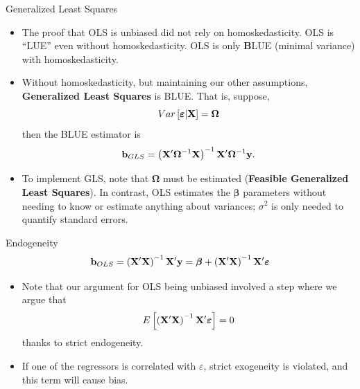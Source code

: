 \begin{frame}{Generalized Least Squares}
\begin{itemize}
	\item The proof that OLS is unbiased did not rely on homoskedasticity. OLS
	is ``LUE'' even without homoskedasticity. OLS is only {\bf B}LUE (minimal variance) with homoskedasticity.

	\smallskip
	\item Without homoskedasticity, but maintaining our other assumptions, {\bf Generalized
		Least Squares} is BLUE. That is, suppose,\[
	Var\left[\boldsymbol{\varepsilon} | {\bf X} \right] = \boldsymbol{\Omega}
	\]
	then the BLUE estimator is \[
	{\bf b}_{GLS} = \left({\bf X}'\boldsymbol{\Omega}^{-1}{\bf X}\right)^{-1} {\bf X}' \boldsymbol{\Omega}^{-1}{\bf y} .
	\]
	
	\smallskip
	\item To implement GLS, note that $\boldsymbol{\Omega}$ must be estimated ({\bf Feasible Generalized
		Least Squares}). In contrast, OLS estimates the $\boldsymbol{\beta}$ parameters without needing to know or estimate
		anything about variances; $\sigma^2$ is only needed to quantify standard errors. 
\end{itemize}
\end{frame}



\begin{frame}{Endogeneity}
\[
	{\bf b}_{OLS} = \left({\bf X}'{\bf X}\right)^{-1} {\bf X}' {\bf y} = \boldsymbol{\beta}  + \left({\bf X}'{\bf X}\right)^{-1} {\bf X}' \boldsymbol{\varepsilon}
	\]
\begin{itemize}
		\item Note that our argument for OLS being unbiased involved a step where we argue that \[
	E\left[\left({\bf X}'{\bf X}\right)^{-1} {\bf X}' \boldsymbol{\varepsilon}\right] =0
	\]
	thanks to strict endogeneity.

	\medskip
	\item If one of the regressors is correlated with $\varepsilon$, strict exogeneity is violated, and this term will cause bias. 

\end{itemize}
\end{frame}


